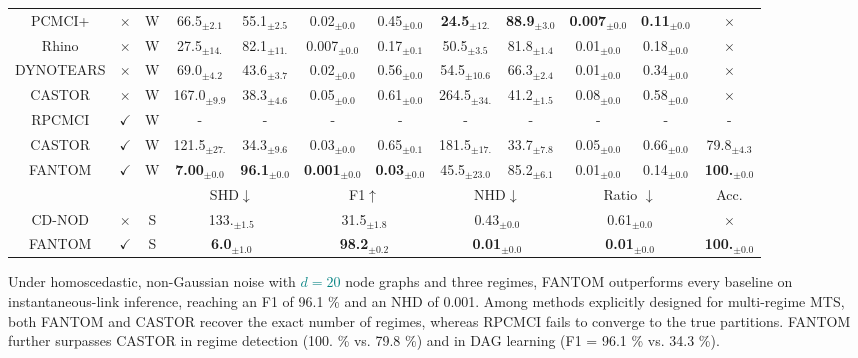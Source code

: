 \begin{table}[H]
{\begin{tabular}{@{}ccc|cccccccc|c@{}}
PCMCI+ & $\times$ & W  & 66.5$_{\pm2.1}$   & 55.1$_{\pm2.5}$  & 0.02$_{\pm0.0}$  & 0.45$_{\pm0.0}$    & \textbf{24.5}$_{\pm12.}$  & \textbf{88.9}$_{\pm3.0}$  & \textbf{0.007}$_{\pm0.0}$  & \textbf{0.11}$_{\pm0.0}$  & $\times$ \\
    Rhino & $\times$ & W &27.5$_{\pm14.}$  & 82.1$_{\pm11.}$ & 0.007$_{\pm0.0}$  & 0.17$_{\pm0.1}$    & 
            50.5$_{\pm3.5}$   & 81.8$_{\pm1.4}$  & 0.01$_{\pm0.0}$  & 0.18$_{\pm0.0}$   & $\times$ \\
    DYNOTEARS & $\times$ & W &  69.0$_{\pm4.2}$   & 43.6$_{\pm3.7}$  & 0.02$_{\pm0.0}$  & 0.56$_{\pm0.0}$    & 
            54.5$_{\pm10.6}$  & 66.3$_{\pm2.4}$  & 0.01$_{\pm0.0}$  & 0.34$_{\pm0.0}$   & $\times$  \\
    CASTOR & $\times$ & W & 167.0$_{\pm9.9}$   & 38.3$_{\pm4.6}$  & 0.05$_{\pm0.0}$  & 0.61$_{\pm0.0}$    & 264.5$_{\pm34.}$  & 41.2$_{\pm1.5}$  & 0.08$_{\pm0.0}$  & 0.58$_{\pm0.0}$ & $\times$  \\
    \midrule
    RPCMCI & $\checkmark$ & W & - & - & - & - & - & - & - & - & -  \\
    CASTOR & $\checkmark$ & W & 121.5$_{\pm27.}$  & 34.3$_{\pm9.6}$  & 0.03$_{\pm0.0}$  & 0.65$_{\pm0.1}$    & 181.5$_{\pm17.}$  & 33.7$_{\pm7.8}$  & 0.05$_{\pm0.0}$  & 0.66$_{\pm0.0}$   & 79.8$_{\pm4.3}$ \\
    \rowcolor{gray!20} FANTOM & $\checkmark$  & W & \textbf{7.00}$_{\pm0.0}$ & \textbf{96.1}$_{\pm0.0}$ & \textbf{0.001}$_{\pm0.0}$ & \textbf{0.03}$_{\pm0.0}$  & 45.5$_{\pm23.0}$ & 85.2$_{\pm6.1}$ & 0.01$_{\pm0.0}$& 0.14$_{\pm0.0}$& \textbf{100.}$_{\pm0.0}$  \\
    \midrule
      &   &  &\multicolumn{2}{c}{SHD$\downarrow$ } &\multicolumn{2}{c}{F1$\uparrow$} & \multicolumn{2}{c}{NHD$\downarrow$} & \multicolumn{2}{c|}{Ratio $\downarrow$ } & Acc.\\
    \midrule
    CD-NOD & $\times$ & S & \multicolumn{2}{c}{133.$_{\pm1.5}$} &\multicolumn{2}{c}{31.5$_{\pm1.8}$} & \multicolumn{2}{c}{0.43$_{\pm0.0}$} & \multicolumn{2}{c|}{0.61$_{\pm0.0}$} & $\times$ \\
    \rowcolor{gray!20} FANTOM & $\checkmark$ & S & \multicolumn{2}{c}{\textbf{6.0}$_{\pm1.0}$} &\multicolumn{2}{c}{\textbf{98.2}$_{\pm0.2}$} & \multicolumn{2}{c}{\textbf{0.01}$_{\pm0.0}$} & \multicolumn{2}{c|}{\textbf{0.01}$_{\pm0.0}$} & \textbf{100.}$_{\pm0.0}$  \\ \bottomrule
\end{tabular}}
\end{table}
Under homoscedastic, non-Gaussian noise with \textcolor{teal}{$d=20$} node graphs and three regimes, FANTOM outperforms every baseline on instantaneous-link inference, reaching an F1 of 96.1 \% and an NHD of 0.001. Among methods explicitly designed for multi-regime MTS, both FANTOM and CASTOR recover the exact number of regimes, whereas RPCMCI fails to converge to the true partitions. FANTOM further surpasses CASTOR in regime detection (100. \% vs. 79.8 \%) and in DAG learning (F1 = 96.1 \% vs. 34.3 \%).

